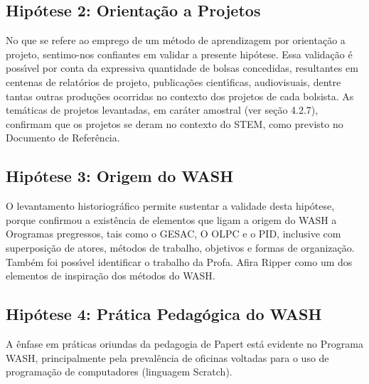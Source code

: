 \documentclass[
12pt,		%
openright,	%
twoside,  %
a4paper,			%
chapter=TITLE,		%
english,			%
french,				%
spanish,			%
brazil				%
]{USPSC-classe/USPSC}
\begin{document}
\subsection[Hip\'otese 2: Orienta\c{c}\~ao a Projetos]{Hip\'otese 2: Orienta\c{c}\~ao a Projetos}\label{Hip\'otese 2: Orienta\c{c}\~ao a Projetos}
No que se refere ao emprego de um m\'etodo de aprendizagem por \textquotedbl orienta\c{c}\~ao a projeto\textquotedbl , sentimo-nos confiantes em validar a presente hip\'otese. Essa valida\c{c}\~ao \'e poss\'{\i}vel por conta da expressiva quantidade de bolsas concedidas, resultantes em centenas de relat\'orios de projeto, publica\c{c}\~oes cient\'{\i}ficas, audiovisuais, dentre tantas outras produ\c{c}\~oes ocorridas no contexto dos projetos de cada bolsista. As tem\'aticas de projetos levantadas, em car\'ater amostral (ver se\c{c}\~ao 4.2.7), confirmam que os projetos se deram no contexto do STEM, como previsto no Documento de Refer\^encia.

















\subsection[Hip\'otese 3: Origem do WASH]{Hip\'otese 3: Origem do WASH}\label{Hip\'otese 3: Origem do WASH}
O levantamento historiogr\'afico permite sustentar a validade desta hip\'otese, porque confirmou a exist\^encia de elementos que ligam a origem do WASH a Orogramas pregressos, tais como o GESAC, O OLPC e o PID, inclusive com superposi\c{c}\~ao de atores, m\'etodos de trabalho, objetivos e formas de organiza\c{c}\~ao. Tamb\'em foi poss\'{\i}vel identificar o trabalho da Profa. Afira Ripper como um dos elementos de inspira\c{c}\~ao dos m\'etodos do WASH.

















\subsection[Hip\'otese 4: Pr\'atica Pedag\'ogica do WASH]{Hip\'otese 4: Pr\'atica Pedag\'ogica do WASH}\label{Hip\'otese 4: Pr\'atica Pedag\'ogica do WASH}
A \^enfase em pr\'aticas oriundas da pedagogia de Papert est\'a evidente no Programa WASH, principalmente pela preval\^encia de oficinas voltadas para o uso de programa\c{c}\~ao de computadores (linguagem Scratch).
\end{document}
